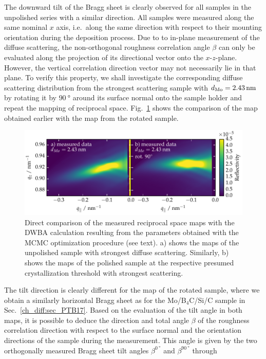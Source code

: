 The downward tilt of the Bragg sheet is clearly observed for all samples in the unpolished series with a similar direction. All samples were measured along the same nominal $x$ axis, i.e.~along the same direction with respect to their mounting orientation during the deposition process. Due to to in-plane measurement of the diffuse scattering, the non-orthogonal roughness correlation angle $\beta$ can only be evaluated along the projection of its directional vector onto the $x$-$z$-plane. However, the vertical correlation direction vector may not necessarily lie in that plane. To verify this property, we shall investigate the corresponding diffuse scattering distribution from the strongest scattering sample with $d_\text{Mo} = \nm{2.43}$ by rotating it by $\SI{90}{\degree}$ around its surface normal onto the sample holder and repeat the mapping of reciprocal space. Fig.~\ref{ch_diff:fig_diffuse_tilt_vs_notilt} shows the comparison of the map obtained earlier with the map from the rotated sample.
\begin{figure}[htbp]
\centering
\includegraphics[width=\textwidth]{img/MoSiC_diffuse_tilt_vs_notilt}
\caption{Direct comparison of the measured reciprocal space maps with the DWBA calculation resulting from the parameters obtained with the MCMC optimization procedure (see text). a) shows the maps of the unpolished sample with strongest diffuse scattering. Similarly, b) shows the maps of the polished sample at the respective presumed crystallization threshold with strongest scattering.}
\label{ch_diff:fig_diffuse_tilt_vs_notilt}
\end{figure}
The tilt direction is clearly different for the map of the rotated sample, where we obtain a similarly horizontal Bragg sheet as for the Mo/B$_4$C/Si/C sample in Sec.~\ref{ch_diff:sec_PTB17}. Based on the evaluation of the tilt angle in both maps, it is possible to deduce the direction and total angle $\beta$ of the roughness correlation direction with respect to the surface normal and the orientation directions of the sample during the measurement. This angle is given by the two orthogonally measured Bragg sheet tilt angles $\beta^{\SI{0}{\degree}}$ and $\beta^{\SI{90}{\degree}}$ through
